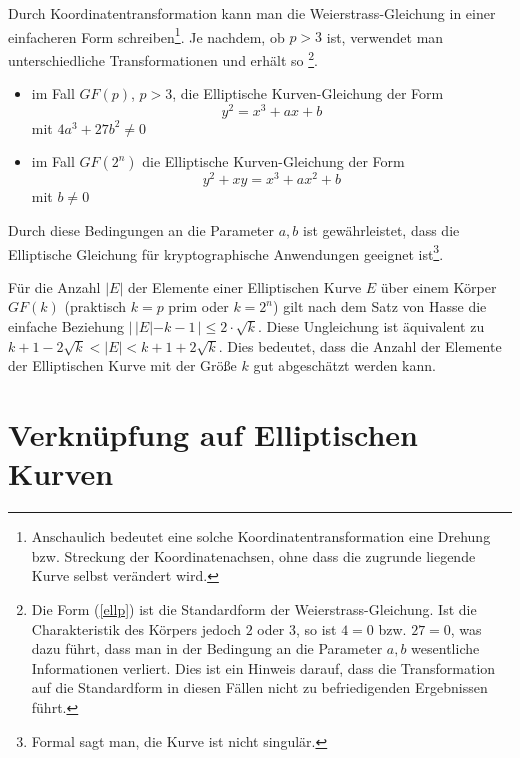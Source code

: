 \begin{refsegment}
Durch Koordinatentransformation kann man die Weierstrass-Gleichung in einer einfacheren Form schreiben\footnote{Anschaulich bedeutet eine solche Koordinatentransformation eine Drehung bzw. Streckung der Koordinatenachsen, ohne dass die zugrunde liegende Kurve selbst verändert wird.}.  Je nachdem, ob $p>3$ ist, verwendet man unterschiedliche Transformationen und erhält so%
\footnote{Die Form (\ref{ellp}) ist die Standardform der Weierstrass-Gleichung. Ist die Charakteristik des Körpers jedoch $2$ oder $3$, so ist $4=0$ bzw. $27=0$, was dazu führt, dass man in der Bedingung an die Parameter $a,b$ wesentliche Informationen verliert. Dies ist ein Hinweis darauf, dass die Transformation auf die Standardform in diesen Fällen nicht zu befriedigenden Ergebnissen führt.}.

\begin{itemize}
\item im Fall $GF(p)$, $p>3$, die Elliptische Kurven-Gleichung der Form
\begin{equation}
 y^2 = x^3 + ax + b
\label{ellp}
\end{equation}
mit $4a^3+27b^2\ne 0$
\item im Fall $GF(2^n)$ die Elliptische Kurven-Gleichung der Form
\begin{equation}
 y^2+xy = x^3 + ax^2 + b
\label{ell2}
\end{equation}
mit $b\ne 0$
\end{itemize}
Durch diese Bedingungen an die Parameter $a,b$ ist gewährleistet, dass die Elliptische Gleichung für kryptographische Anwendungen geeignet ist\footnote{Formal sagt man, die Kurve ist nicht singulär.}.


Für die Anzahl $|E|$ der Elemente einer Elliptischen Kurve $E$ über einem Körper $GF(k)$ (praktisch $k=p$ prim oder $k=2^n$) gilt nach dem Satz von Hasse \cite{Silverman2009} die einfache Beziehung $| \, |E| - k-1\,| \le 2\cdot \sqrt{k}$. Diese Ungleichung ist äquivalent zu $k+1 - 2\sqrt{k} < |E| < k+1+2\sqrt{k}$. Dies bedeutet, dass die Anzahl der Elemente der Elliptischen Kurve mit der Größe $k$ gut abgeschätzt werden kann.



\section{Verknüpfung auf Elliptischen Kurven}


\end{refsegment}
